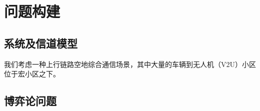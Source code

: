 \begin{comment}
\subsection{NOMA技术的理论基础}\label{section2-1-1}
大多数情况下，需要插入的图形是单个的时候可以使用如下环境：

\subsection{CR技术的理论基础}\label{section2-1-2}
其中的参数“[width=$\backslash$textwidth]”指定图形的宽度0.6倍页宽。最后的效果如图\ref{ysulogo}所示。
\begin{figure}[hptb!]
 \centering\small
 \texttt{[image: ysulogo]}
 \Figcaption{单个居中图形}\label{ysulogo}
\end{figure}
\subsection{MEC技术的理论基础}\label{section2-1-3}

最终结果如图\ref{fig-dbfig}所示。
\begin{figure}[hptb!]
  \centering\small
  \begin{minipage}[t]{0.5\linewidth}
    \centering
    \texttt{[image: chp-2\_bessel\_j]}
    (a) 子图a图题子图a图题子图a图题
  \end{minipage}%
  \begin{minipage}[t]{0.5\textwidth}
    \centering
    \texttt{[image: chp-2\_bessel\_k]}
    (b) 子图b图题子图b图题子图b图题
  \end{minipage}
    \Figcaption{两个并排图形}\label{fig-dbfig}
 \end{figure}
\end{comment}

\section{问题构建}\label{section2-2}
\subsection{系统及信道模型}\label{section2-2-1}
我们考虑一种上行链路空地综合通信场景，其中大量的车辆到无人机（V2U）小区位于宏小区之下。
\subsection{博弈论问题}\label{section2-2-1}

